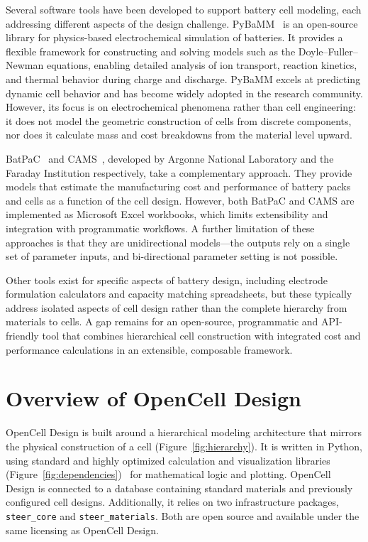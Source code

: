 \documentclass[12pt]{article}
\begin{document}
Several software tools have been developed to support battery cell modeling, each addressing different aspects of the design challenge. PyBaMM~\cite{sulzer2021pybamm} is an open-source library for physics-based electrochemical simulation of batteries. It provides a flexible framework for constructing and solving models such as the Doyle--Fuller--Newman equations, enabling detailed analysis of ion transport, reaction kinetics, and thermal behavior during charge and discharge. PyBaMM excels at predicting dynamic cell behavior and has become widely adopted in the research community. However, its focus is on electrochemical phenomena rather than cell engineering: it does not model the geometric construction of cells from discrete components, nor does it calculate mass and cost breakdowns from the material level upward.

BatPaC~\cite{nelson2019batpac} and CAMS~\cite{cams2023}, developed by Argonne National Laboratory and the Faraday Institution respectively, take a complementary approach. They provide models that estimate the manufacturing cost and performance of battery packs and cells as a function of the cell design. However, both BatPaC and CAMS are implemented as Microsoft Excel workbooks, which limits extensibility and integration with programmatic workflows. A further limitation of these approaches is that they are unidirectional models---the outputs rely on a single set of parameter inputs, and bi-directional parameter setting is not possible.

Other tools exist for specific aspects of battery design, including electrode formulation calculators and capacity matching spreadsheets, but these typically address isolated aspects of cell design rather than the complete hierarchy from materials to cells. A gap remains for an open-source, programmatic and API-friendly tool that combines hierarchical cell construction with integrated cost and performance calculations in an extensible, composable framework.

\section{Overview of OpenCell Design}

OpenCell Design is built around a hierarchical modeling architecture that mirrors the physical construction of a cell (Figure~\ref{fig:hierarchy}). It is written in Python, using standard and highly optimized calculation and visualization libraries (Figure~\ref{fig:dependencies})~\cite{harris2020numpy,virtanen2020scipy,plotly2015} for mathematical logic and plotting. OpenCell Design is connected to a database containing standard materials and previously configured cell designs. Additionally, it relies on two infrastructure packages, \texttt{steer\_core} and \texttt{steer\_materials}. Both are open source and available under the same licensing as OpenCell Design.
\end{document}
